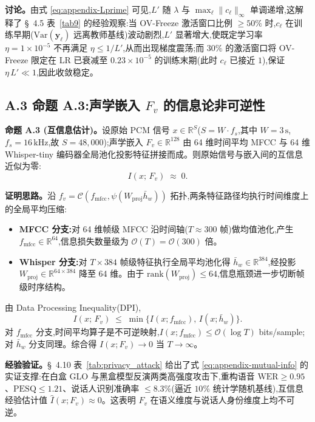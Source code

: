 \documentclass[11pt, a4paper]{article}
\begin{document}
\noindent\textbf{讨论。}\quad 由式 \eqref{eq:appendix-Lprime} 可见,$L'$ 随 $\lambda$ 与 $\max_\ell\|c_\ell\|_\infty$ 单调递增,这解释了 \S~4.5 表~\ref{tab9} 的经验观察:当 OV-Freeze 激活窗口比例 $\ge 50\%$ 时,$c_\ell$ 在训练早期($\mathrm{Var}(\bm{y}_\ell)$ 远离教师基线)波动剧烈,$L'$ 显著增大,使既定学习率 $\eta=1\times10^{-5}$ 不再满足 $\eta\le 1/L'$,从而出现梯度震荡;而 $30\%$ 的激活窗口将 OV-Freeze 限定在 LR 已衰减至 $0.23\times10^{-5}$ 的训练末期(此时 $c_\ell$ 已接近 $1$),保证 $\eta\,L'\ll 1$,因此收敛稳定。

\subsection*{A.3 命题 A.3:声学嵌入 $F_v$ 的信息论非可逆性}

\noindent\textbf{命题 A.3 (互信息估计)。}\quad 设原始 PCM 信号 $x\in\mathbb{R}^{S}$($S=W\cdot f_s$,其中 $W=3\,\mathrm{s}$,$f_s=16\,\mathrm{kHz}$,故 $S=48{,}000$);声学嵌入 $F_v\in\mathbb{R}^{128}$ 由 64 维时间平均 MFCC 与 64 维 Whisper-tiny 编码器全局池化投影特征拼接而成。则原始信号与嵌入间的互信息近似为零:
\begin{equation}
\label{eq:appendix-mutual-info}
I(x;\,F_v)
\;\approx\;
0.
\end{equation}

\noindent\textbf{证明思路。}\quad 沿 $f_v = \mathcal{C}(f_{\mathrm{mfcc}},\psi(W_{\mathrm{proj}}\bar h_w))$ 拓扑,两条特征路径均执行时间维度上的全局平均压缩:

\begin{itemize}
\item \textbf{MFCC 分支:}对 64 维帧级 MFCC 沿时间轴($T\approx 300$ 帧)做均值池化,产生 $f_{\mathrm{mfcc}}\in\mathbb{R}^{64}$,信息损失数量级为 $\mathcal{O}(T)=\mathcal{O}(300)$ 倍。
\item \textbf{Whisper 分支:}对 $T\times 384$ 帧级特征执行全局平均池化得 $\bar h_w\in\mathbb{R}^{384}$,经投影 $W_{\mathrm{proj}}\in\mathbb{R}^{64\times384}$ 降至 64 维。由于 $\mathrm{rank}(W_{\mathrm{proj}})\le 64$,信息瓶颈进一步切断帧级时序结构。
\end{itemize}

由 Data Processing Inequality(DPI),
\[
I(x;\,F_v)
\;\le\;
\min\!\bigl\{I(x;f_{\mathrm{mfcc}}),\,I(x;\bar h_w)\bigr\}.
\]
对 $f_{\mathrm{mfcc}}$ 分支,时间平均算子是不可逆映射,$I(x;f_{\mathrm{mfcc}})\le \mathcal{O}(\log T)$ bits/sample;对 $\bar h_w$ 分支同理。综合得 $I(x;F_v)\to 0$ 当 $T\to\infty$。

\noindent\textbf{经验验证。}\quad \S~4.10 表~\ref{tab:privacy_attack} 给出了式 \eqref{eq:appendix-mutual-info} 的实证支撑:在白盒 GLO 与黑盒模型反演两类高强度攻击下,重构语音 $\mathrm{WER}\ge 0.95$、$\mathrm{PESQ}\le 1.21$、说话人识别准确率 $\le 8.3\%$(逼近 $10\%$ 统计学随机基线),互信息经验估计值 $\hat I(x;F_v)\approx 0$。这表明 $F_v$ 在语义维度与说话人身份维度上均不可逆。



\newpage

\printbibliography
\end{document}
